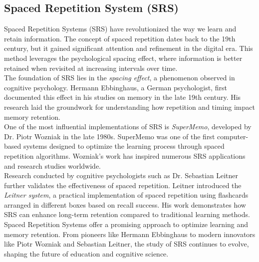 \documentclass[12pt]{article}
\begin{document}
\subsection{Spaced Repetition System (SRS)}
Spaced Repetition Systems (SRS) have revolutionized the way we learn and retain information. The concept of spaced repetition dates back to the 19th century, but it gained significant attention and refinement in the digital era. This method leverages the psychological spacing effect, where information is better retained when revisited at increasing intervals over time. \\
The foundation of SRS lies in the \textit{spacing effect}, a phenomenon observed in cognitive psychology. Hermann Ebbinghaus, a German psychologist, first documented this effect in his studies on memory in the late 19th century. His research laid the groundwork for understanding how repetition and timing impact memory retention.\\
One of the most influential implementations of SRS is \textit{SuperMemo}, developed by Dr. Piotr Wozniak in the late 1980s. SuperMemo was one of the first computer-based systems designed to optimize the learning process through spaced repetition algorithms. Wozniak's work has inspired numerous SRS applications and research studies worldwide.\\
Research conducted by cognitive psychologists such as Dr. Sebastian Leitner further validates the effectiveness of spaced repetition. Leitner introduced the \textit{Leitner system}, a practical implementation of spaced repetition using flashcards arranged in different boxes based on recall success. His work demonstrates how SRS can enhance long-term retention compared to traditional learning methods.\\
Spaced Repetition Systems offer a promising approach to optimize learning and memory retention. From pioneers like Hermann Ebbinghaus to modern innovators like Piotr Wozniak and Sebastian Leitner, the study of SRS continues to evolve, shaping the future of education and cognitive science.
\end{document}
